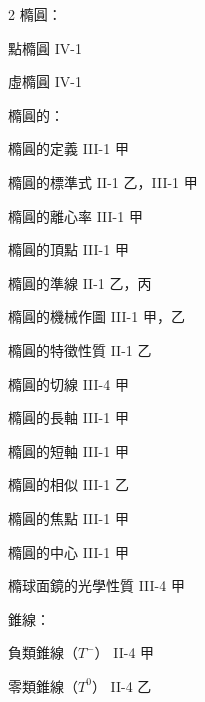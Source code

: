 \begin{multicols}{2}
\noindent 橢圓：\par
\noindent\hspace*{1.5em} 點橢圓 \hfill IV-1\par
\noindent\hspace*{1.5em} 虛橢圓 \hfill IV-1\par
\noindent 橢圓的：\par
\noindent\hspace*{1.5em} 橢圓的定義 \hfill III-1 甲\par
\noindent\hspace*{1.5em} 橢圓的標準式 \hfill II-1 乙，III-1 甲\par
\noindent\hspace*{1.5em} 橢圓的離心率 \hfill III-1 甲\par
\noindent\hspace*{1.5em} 橢圓的頂點 \hfill III-1 甲\par
\noindent\hspace*{1.5em} 橢圓的準線 \hfill II-1 乙，丙\par
\noindent\hspace*{1.5em} 橢圓的機械作圖 \hfill III-1 甲，乙\par
\noindent\hspace*{1.5em} 橢圓的特徵性質 \hfill II-1 乙\par
\noindent\hspace*{1.5em} 橢圓的切線 \hfill III-4 甲\par
\noindent\hspace*{1.5em} 橢圓的長軸 \hfill III-1 甲\par
\noindent\hspace*{1.5em} 橢圓的短軸 \hfill III-1 甲\par
\noindent\hspace*{1.5em} 橢圓的相似 \hfill III-1 乙\par
\noindent\hspace*{1.5em} 橢圓的焦點 \hfill III-1 甲\par
\noindent\hspace*{1.5em} 橢圓的中心 \hfill III-1 甲\par
\noindent 橢球面鏡的光學性質 \hfill III-4 甲\par
\noindent 錐線：\par
\noindent\hspace*{1.5em} 負類錐線（$T^-$） \hfill II-4 甲\par
\noindent\hspace*{1.5em} 零類錐線（$T^0$） \hfill II-4 乙\par

\end{multicols}

